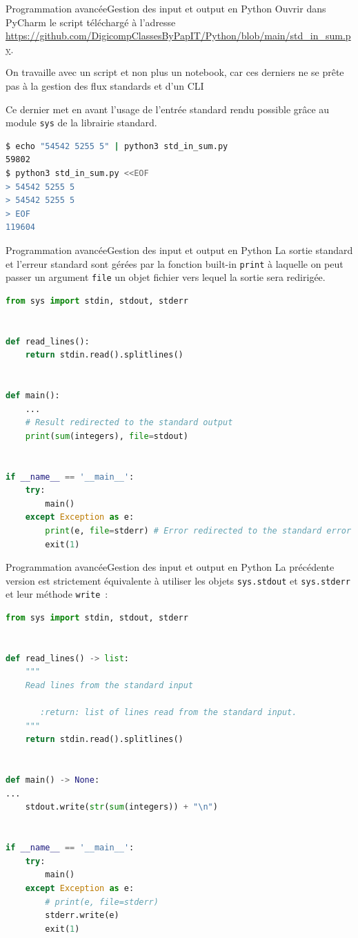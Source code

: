 \documentclass{beamer}
\begin{document}
    \begin{frame}[fragile]{Programmation avancée}{Gestion des input et output en Python}
        Ouvrir dans PyCharm le script téléchargé à l'adresse \url{https://github.com/DigicompClassesByPapIT/Python/blob/main/std_in_sum.py}.
        \begin{dangercolorbox}
            On travaille avec un script et non plus un notebook, car ces derniers ne se prête pas à la gestion des flux standards et d'un CLI
        \end{dangercolorbox}
        Ce dernier met en avant l'usage de l'entrée standard rendu possible grâce au module \lstinline{sys} de la librairie standard.
        \begin{lstlisting}[language=bash]
$ echo "54542 5255 5" | python3 std_in_sum.py
59802
$ python3 std_in_sum.py <<EOF
> 54542 5255 5
> 54542 5255 5
> EOF
119604
        \end{lstlisting}
    \end{frame}

    \begin{frame}[fragile]{Programmation avancée}{Gestion des input et output en Python}
        La sortie standard et l'erreur standard sont gérées par la fonction built-in \lstinline{print} à laquelle on peut passer un argument \lstinline{file} un objet fichier vers lequel la sortie sera redirigée.
        \begin{lstlisting}[language=Python,basicstyle=\tiny\ttfamily]
from sys import stdin, stdout, stderr


def read_lines():
    return stdin.read().splitlines()


def main():
    ...
    # Result redirected to the standard output
    print(sum(integers), file=stdout)


if __name__ == '__main__':
    try:
        main()
    except Exception as e:
        print(e, file=stderr) # Error redirected to the standard error
        exit(1)
        \end{lstlisting}
    \end{frame}

    \begin{frame}[fragile]{Programmation avancée}{Gestion des input et output en Python}
        La précédente version est strictement équivalente à utiliser les objets \lstinline{sys.stdout} et \lstinline{sys.stderr} et leur méthode \lstinline{write}~:
        \begin{lstlisting}[language=Python,basicstyle=\tiny\ttfamily]
from sys import stdin, stdout, stderr


def read_lines() -> list:
    """
    Read lines from the standard input

       :return: list of lines read from the standard input.
    """
    return stdin.read().splitlines()


def main() -> None:
...
    stdout.write(str(sum(integers)) + "\n")


if __name__ == '__main__':
    try:
        main()
    except Exception as e:
        # print(e, file=stderr)
        stderr.write(e)
        exit(1)
        \end{lstlisting}
    \end{frame}
\end{document}
